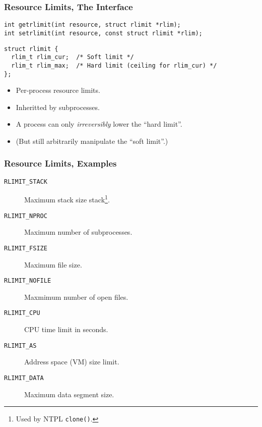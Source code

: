 \begin{frame}[fragile]

\frametitle{Resource Limits, The Interface}

\begin{manblock}

\footnotesize

\begin{lstlisting}
int getrlimit(int resource, struct rlimit *rlim);
int setrlimit(int resource, const struct rlimit *rlim);
\end{lstlisting}

\begin{lstlisting}
struct rlimit {
  rlim_t rlim_cur;  /* Soft limit */
  rlim_t rlim_max;  /* Hard limit (ceiling for rlim_cur) */
};
\end{lstlisting}

\end{manblock}

\begin{itemize}

\item Per-process resource limits.

\item Inheritted by subprocesses.

\item A process can only \emph{irreversibly} lower the ``hard limit''.

\item (But still arbitrarily manipulate the ``soft limit''.)

\end{itemize}

\end{frame}


\begin{frame}[fragile]

\frametitle{Resource Limits, Examples}


\begin{description}

\item[\texttt{RLIMIT\_STACK}] Maximum stack size
stack\footnote{Used by NTPL \texttt{clone()}.}.

\item[\texttt{RLIMIT\_NPROC}] Maximum number of subprocesses.

\item[\texttt{RLIMIT\_FSIZE}] Maximum file size.

\item[\texttt{RLIMIT\_NOFILE}] Maxmimum number of open files.

\item[\texttt{RLIMIT\_CPU}] CPU time limit in seconds.

\item[\texttt{RLIMIT\_AS}] Address space (VM) size limit.

\item[\texttt{RLIMIT\_DATA}] Maximum data segment size.

\end{description}

\end{frame}
